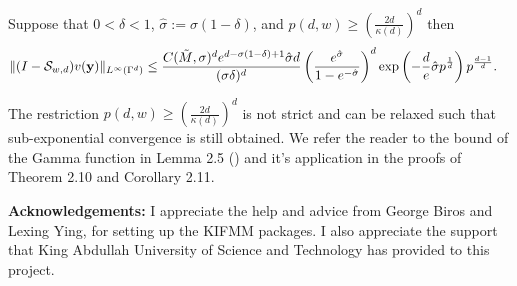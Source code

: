 \documentclass[11pt,final]{amsart}       %
\begin{document}
\begin{lemma} Suppose that $0< \delta < 1$, $\hat
  \sigma := \sigma (1 - \delta)$, and $p(d,w) \geq \left(\frac{2
    d}{\kappa(d)}\right)^{d}$ then
  \[
  \begin{split}
 &\| (I - \mathcal{S}_{w,d})
 v(\mathbf{y})
 \|_{L^{\infty}(\Gamma^{d})}
 \leq 
 \frac{C(\tilde M,\sigma)^d e^{d - \sigma(1 - \delta) + 1} \hat \sigma d }
 {
(\sigma \delta)^{d}}
 \left( \frac{e^{\hat \sigma}}{1 - e^{-\hat \sigma}} \right)^{d} 
 \exp \left(-\frac{d}{e} \hat \sigma  p^{\frac{1}{d}}
 \right) p^{\frac{d-1}{d}}.
 \end{split}
 \]
 \label{interpolation:lemma1}
\end{lemma}


\begin{remark}
The restriction $p(d,w) \geq \left(\frac{2
  d}{\kappa(d)}\right)^{d}$ is not strict and can be relaxed such that
sub-exponential convergence is still obtained.  We refer the reader to
the bound of the Gamma function in Lemma 2.5 (\cite{Griebel2016}) and
it's application in the proofs of Theorem 2.10 and Corollary 2.11.
\label{interpolation:remark1}
\end{remark}




\noindent 
\textbf{Acknowledgements:} I appreciate the help and advice from
George Biros and Lexing Ying, for setting up the KIFMM packages.  I
also appreciate the support that King Abdullah University of Science
and Technology has provided to this project.





 
\end{document}
